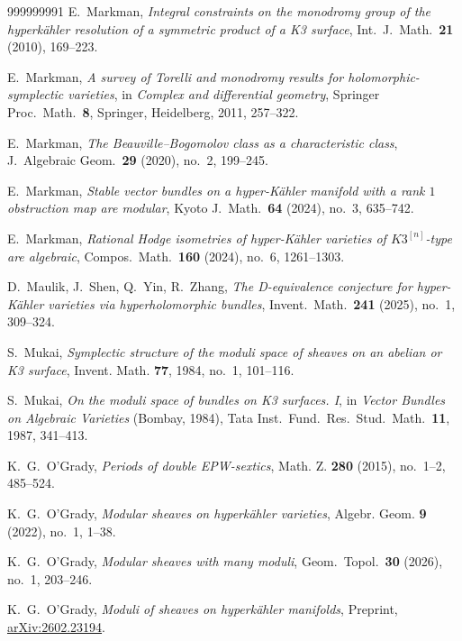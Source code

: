 \documentclass[12pt,a4paper]{amsart}
\theoremstyle{plain}
\theoremstyle{definition}
\theoremstyle{remark}
\begin{document}
\begin{thebibliography}{999999991}
E.~Markman,
\textit{Integral constraints on the monodromy group of the hyperk\"ahler resolution of a symmetric product of a K3 surface},
Int.\ J.\ Math.\ \textbf{21} (2010), 169--223.

E.~Markman,
\textit{A survey of Torelli and monodromy results for holomorphic-symplectic varieties},
in \textit{Complex and differential geometry},
Springer Proc.\ Math.\ \textbf{8}, Springer, Heidelberg, 2011, 257--322.

E.~Markman,
\textit{The Beauville--Bogomolov class as a characteristic class},
J.\ Algebraic Geom.\ \textbf{29} (2020), no.~2, 199--245.

E.~Markman,
\textit{Stable vector bundles on a hyper-K\"ahler manifold with a rank $1$ obstruction map are modular},
Kyoto J.\ Math.\ \textbf{64} (2024), no.~3, 635--742.

E.~Markman,
\textit{Rational Hodge isometries of hyper-K\"ahler varieties of $K3^{[n]}$-type are algebraic},
Compos.\ Math.\ \textbf{160} (2024), no.~6, 1261--1303.

D.~Maulik, J.~Shen, Q.~Yin, R.~Zhang,
\textit{The D-equivalence conjecture for hyper-K\"ahler varieties via hyperholomorphic bundles},
Invent.\ Math.\ \textbf{241} (2025), no.~1, 309--324.

S.~Mukai,
\textit{Symplectic structure of the moduli space of sheaves on an abelian or K3 surface}, Invent. Math. \textbf{77}, 1984, no.~1, 101--116.

S.~Mukai,
\textit{On the moduli space of bundles on K3 surfaces. I},
in \textit{Vector Bundles on Algebraic Varieties} (Bombay, 1984),
Tata Inst.\ Fund.\ Res.\ Stud.\ Math.\ \textbf{11}, 1987, 341--413.

K.~G.~O'Grady, \textit{Periods of double EPW-sextics}, Math. Z. \textbf{280} (2015), no.~1--2, 485--524.

K.~G.~O'Grady, 
\textit{Modular sheaves on hyperkähler varieties}, 
Algebr. Geom. \textbf{9} (2022), no.~1, 1--38.

K.~G.~O'Grady,
\textit{Modular sheaves with many moduli},
Geom.\ Topol.\ \textbf{30} (2026), no.~1, 203--246.

K.~G.~O'Grady,
\textit{Moduli of sheaves on hyperk\"ahler manifolds},
Preprint, \href{https://arxiv.org/abs/2602.23194}{arXiv:2602.23194}.


\end{thebibliography}
\end{document}

